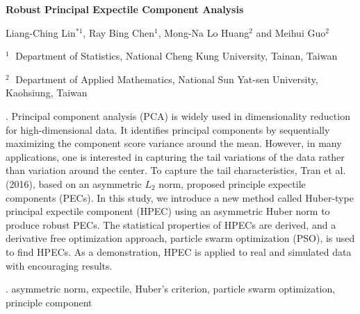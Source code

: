 \documentclass[12pt]{article}
\begin{document}
\begin{flushleft}


{\LARGE\bf Robust Principal Expectile Component Analysis}


\vspace{1.0cm}

Liang-Ching Lin$^{*1}$, Ray Bing Chen$^1$, Mong-Na Lo Huang$^2$ and Meihui Guo$^2$

\begin{description}

\item $^1  \;$ Department of Statistics, National Cheng Kung University,
Tainan, Taiwan

\item $^2 \;$ Department of Applied Mathematics, National Sun Yat-sen University, Kaohsiung, Taiwan

\end{description}

\end{flushleft}




\vspace{0.75cm}

. Principal component analysis (PCA) is widely used in dimensionality
reduction for high-dimensional data. It identifies principal components by sequentially
maximizing the component score variance around the mean. However,
in many applications, one is interested in capturing the tail variations of the
data rather than variation around the center. To capture the tail characteristics,
Tran et al. (2016), based on an asymmetric $L_2$ norm, proposed principle expectile
components (PECs). In this study, we introduce a new method called Huber-type
principal expectile component (HPEC) using an asymmetric Huber norm
to produce robust PECs. The statistical properties of HPECs are derived, and
a derivative free optimization approach, particle swarm optimization (PSO), is
used to find HPECs. As a demonstration, HPEC is applied to real and simulated
data with encouraging results.

\vskip 2mm

.
asymmetric norm, expectile, Huber's criterion, particle
swarm optimization, principle component
\end{document}
